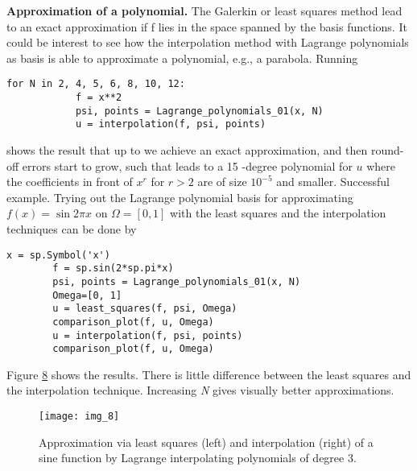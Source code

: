 \documentclass[../main.tex]{subfiles}
\begin{document}
	\noindent \textbf{Approximation of a polynomial.} The Galerkin or least squares method lead
	to an exact approximation if f lies in the space spanned by the basis functions. It
	could be interest to see how the interpolation method with Lagrange polynomials
	as basis is able to approximate a polynomial, e.g., a parabola. Running
	\begin{lstlisting}[numbers=none]
		for N in 2, 4, 5, 6, 8, 10, 12:
			f = x**2
			psi, points = Lagrange_polynomials_01(x, N)
			u = interpolation(f, psi, points)	
	\end{lstlisting}
	shows the result that up to  we achieve an exact approximation, and then round-off errors start to grow, such that  leads to a 15 -degree polynomial for $u$ where the coefficients in front of $x^{r}$ for $r>2$ are of size $10^{-5}$ and smaller.
	Successful example. Trying out the Lagrange polynomial basis for approximating $f(x)=\sin 2 \pi x$ on $\Omega=[0,1]$ with the least squares and the interpolation techniques can be done by
	\begin{lstlisting}[numbers=none]
		x = sp.Symbol('x')
		f = sp.sin(2*sp.pi*x)
		psi, points = Lagrange_polynomials_01(x, N)
		Omega=[0, 1]
		u = least_squares(f, psi, Omega)
		comparison_plot(f, u, Omega)
		u = interpolation(f, psi, points)
		comparison_plot(f, u, Omega)	
	\end{lstlisting}
	Figure \hyperref[fig:img_8]{8} shows the results. There is little difference between the least squares and
	the interpolation technique. Increasing \textit{N} gives visually better approximations.
	\begin{figure}[H]
		\centering
		\texttt{[image: img\_8]}
		\caption{Approximation via least squares (left) and interpolation (right) of a
			sine function by Lagrange interpolating polynomials of degree 3.}
		\label{fig:img_8}
	\end{figure}	
	
\end{document}
